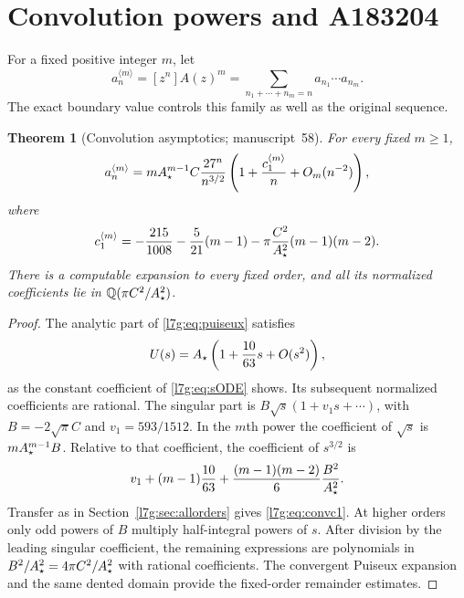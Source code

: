 \documentclass[11pt,letterpaper]{article}
\newtheorem{theorem}{Theorem}[section]
\theoremstyle{remark}\newtheorem{remark}[theorem]{Remark}
\newcommand{\Q}{\mathbb Q}\newcommand{\tht}{\vartheta}
\newcounter{l7gtrsavedeq}
\begin{document}
\section{Convolution powers and A183204}\label{l7g:sec:convolution}

For a fixed positive integer $m$, let
\[
 a_n^{\langle m\rangle}=[z^n]A(z)^m
 =\sum_{n_1+\cdots+n_m=n}a_{n_1}\cdots a_{n_m}.
\]
The exact boundary value controls this family as well as the original
sequence.

\begin{theorem}[Convolution asymptotics; manuscript~58]\label{l7g:th:convolution}
For every fixed $m\ge1$,
\begin{equation}\label{l7g:eq:convmain}
 a_n^{\langle m\rangle}
 =mA_\star^{m-1}C\frac{27^n}{n^{3/2}}
 \left(1+\frac{c_1^{\langle m\rangle}}n+O_m(n^{-2})\right),
\end{equation}
where
\begin{equation}\label{l7g:eq:convc1}
 c_1^{\langle m\rangle}
 =-\frac{215}{1008}-\frac5{21}(m-1)
   -\pi\frac{C^2}{A_\star^2}(m-1)(m-2).
\end{equation}
There is a computable expansion to every fixed order, and all its
normalized coefficients lie in $\Q(\pi C^2/\Ast^2)$.
\end{theorem}

\begin{proof}
The analytic part of \eqref{l7g:eq:puiseux} satisfies
\[
 U(s)=A_\star\left(1+\frac{10}{63}s+O(s^2)\right),
\]
as the constant coefficient of \eqref{l7g:eq:sODE} shows. Its subsequent
normalized coefficients are rational. The singular part is
$B\sqrt{s}(1+v_1s+\cdots)$, with $B=-2\sqrt\pi C$ and
$v_1=593/1512$. In the $m$th power the coefficient of $\sqrt{s}$ is
$mA_\star^{m-1}B$. Relative to that coefficient, the coefficient of
$s^{3/2}$ is
\[
 v_1+(m-1)\frac{10}{63}
       +\frac{(m-1)(m-2)}6\frac{B^2}{A_\star^2}.
\]
Transfer as in Section~\ref{l7g:sec:allorders} gives \eqref{l7g:eq:convc1}.
At higher orders only odd powers of $B$ multiply half-integral powers of
$s$. After division by the leading singular coefficient, the remaining
expressions are polynomials in $B^2/A_\star^2=4\pi C^2/A_\star^2$ with rational
coefficients. The convergent Puiseux expansion and the same dented domain
provide the fixed-order remainder estimates.
\end{proof}
\end{document}
